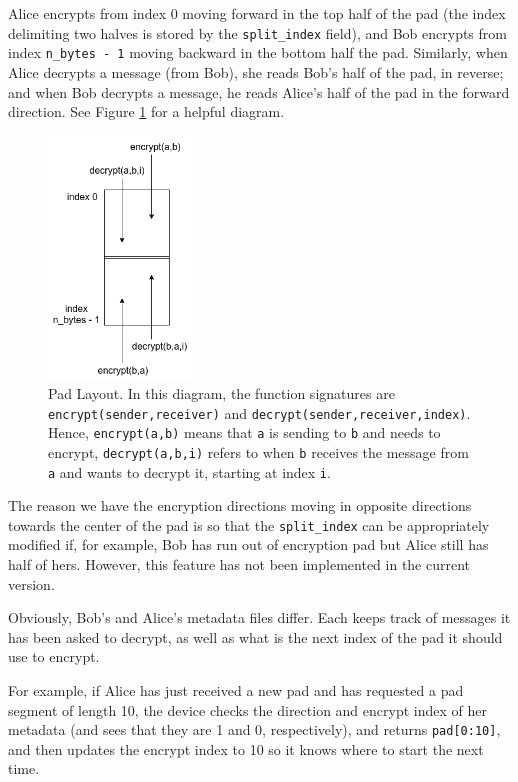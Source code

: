 \documentclass[twocolumn]{article}
\begin{document}
Alice encrypts from index 0 moving forward in the top half of the pad (the index delimiting two halves is stored by the \texttt{split\_index} field), and Bob encrypts from index \texttt{n\_bytes - 1} moving backward in the bottom half the pad. Similarly, when Alice decrypts a message (from Bob), she reads Bob's half of the pad, in reverse; and when Bob decrypts a message, he reads Alice's half of the pad in the forward direction. See Figure \ref{fig:padsplit} for a helpful diagram.

\begin{figure}[htp]
\centering
\includegraphics[width=1.5in]{padsplit}
\caption{Pad Layout. In this diagram, the function signatures are \texttt{encrypt(sender,receiver)} and \texttt{decrypt(sender,receiver,index)}. Hence, \texttt{encrypt(a,b)} means that \texttt{a} is sending to \texttt{b} and needs to encrypt, \texttt{decrypt(a,b,i)} refers to when \texttt{b} receives the message from \texttt{a} and wants to decrypt it, starting at index \texttt{i}.}
\label{fig:padsplit}
\end{figure}

The reason we have the encryption directions moving in opposite directions towards the center of the pad is so that the \texttt{split\_index} can be appropriately modified if, for example, Bob has run out of encryption pad but Alice still has half of hers. However, this feature has not been implemented in the current version.

Obviously, Bob's and Alice's metadata files differ. Each keeps track of messages it has been asked to decrypt, as well as what is the next index of the pad it should use to encrypt.

For example, if Alice has just received a new pad and has requested a pad segment of length 10, the device checks the direction and encrypt index of her metadata (and sees that they are 1 and 0, respectively), and returns \texttt{pad[0:10]}, and then updates the encrypt index to 10 so it knows where to start the next time.
\end{document}
